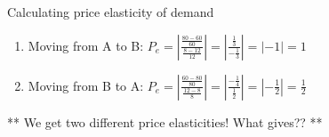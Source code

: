 \documentclass[compress]{beamer}
\begin{document}
\begin{frame}{Calculating price elasticity of demand}
\begin{enumerate}
    \item Moving from A to B: \(P_e = |\frac{\frac{80-60}{60}}{\frac{8-12}{12}} |= |\frac{\frac{1}{3}}{-\frac{1}{3}}| = |-1| = 1\)
    \item Moving from B to A: \(P_e = |\frac{\frac{60-80}{80}}{\frac{12-8}{8}}| = |\frac{-\frac{1}{4}}{\frac{1}{2}}| = |-\frac{1}{2}| = \frac{1}{2}\)
\end{enumerate}
\begin{center}
    ** We get two different price elasticities! What gives?? **
\end{center}

    
\end{frame}
\end{document}
